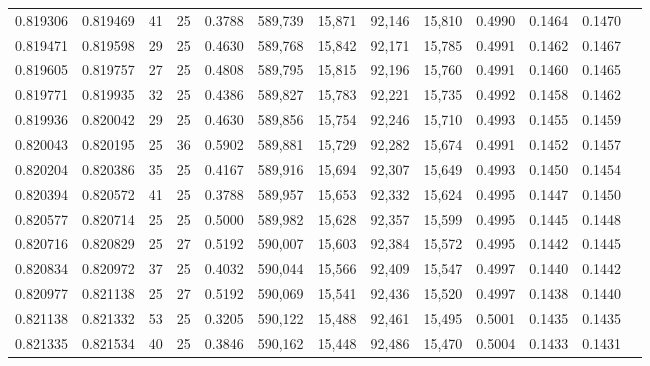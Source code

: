 \begin{tabular}{rrrrrrrrrrrrr}
0.819306 & 0.819469 &    41 &  25 &                                     0.3788 & 589,739 &  15,871 &  92,146 &  15,810 & 0.4990 & 0.1464 & 0.1470 \\
0.819471 & 0.819598 &    29 &  25 &                                     0.4630 & 589,768 &  15,842 &  92,171 &  15,785 & 0.4991 & 0.1462 & 0.1467 \\
0.819605 & 0.819757 &    27 &  25 &                                     0.4808 & 589,795 &  15,815 &  92,196 &  15,760 & 0.4991 & 0.1460 & 0.1465 \\
0.819771 & 0.819935 &    32 &  25 &                                     0.4386 & 589,827 &  15,783 &  92,221 &  15,735 & 0.4992 & 0.1458 & 0.1462 \\
0.819936 & 0.820042 &    29 &  25 &                                     0.4630 & 589,856 &  15,754 &  92,246 &  15,710 & 0.4993 & 0.1455 & 0.1459 \\
0.820043 & 0.820195 &    25 &  36 &                                     0.5902 & 589,881 &  15,729 &  92,282 &  15,674 & 0.4991 & 0.1452 & 0.1457 \\
0.820204 & 0.820386 &    35 &  25 &                                     0.4167 & 589,916 &  15,694 &  92,307 &  15,649 & 0.4993 & 0.1450 & 0.1454 \\
0.820394 & 0.820572 &    41 &  25 &                                     0.3788 & 589,957 &  15,653 &  92,332 &  15,624 & 0.4995 & 0.1447 & 0.1450 \\
0.820577 & 0.820714 &    25 &  25 &                                     0.5000 & 589,982 &  15,628 &  92,357 &  15,599 & 0.4995 & 0.1445 & 0.1448 \\
0.820716 & 0.820829 &    25 &  27 &                                     0.5192 & 590,007 &  15,603 &  92,384 &  15,572 & 0.4995 & 0.1442 & 0.1445 \\
0.820834 & 0.820972 &    37 &  25 &                                     0.4032 & 590,044 &  15,566 &  92,409 &  15,547 & 0.4997 & 0.1440 & 0.1442 \\
0.820977 & 0.821138 &    25 &  27 &                                     0.5192 & 590,069 &  15,541 &  92,436 &  15,520 & 0.4997 & 0.1438 & 0.1440 \\
0.821138 & 0.821332 &    53 &  25 &                                     0.3205 & 590,122 &  15,488 &  92,461 &  15,495 & 0.5001 & 0.1435 & 0.1435 \\
0.821335 & 0.821534 &    40 &  25 &                                     0.3846 & 590,162 &  15,448 &  92,486 &  15,470 & 0.5004 & 0.1433 & 0.1431 \\

\end{tabular}
